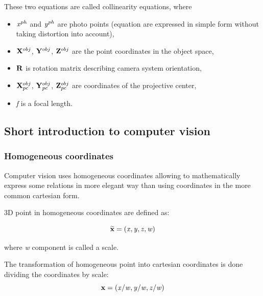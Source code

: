 \documentclass[a4paper,12pt]{article}
\newcommand{\ematr}[1]{
{\bf #1}
}
\newcommand{\evect}[1]{
{\bf #1}
}
\newcommand{\ehvect}[1]{
{\bf \widetilde{#1}}
}
\newcommand{\escal}[1]{
{\it #1}
}
\begin{document}
These two equations are called collinearity equations, where
\begin{itemize}
  \item $\escal{x}^{ph}$ and $\escal{y}^{ph}$ are photo points (equation are expressed in simple form without taking distortion into account),
  \item $\evect{X}^{obj}$, $\evect{Y}^{obj}$, $\evect{Z}^{obj}$ are the point coordinates in the object space,
  \item $\ematr{R}$ is rotation matrix describing camera system orientation,
  \item $\evect{X}^{obj}_{pc}$, $\evect{Y}^{obj}_{pc}$, $\evect{Z}^{obj}_{pc}$ are coordinates of the projective center,
  \item \escal{f} is a focal length.
\end{itemize}


\subsection{Short introduction to computer vision}


\subsubsection{Homogeneous coordinates}


Computer vision uses homogeneous coordinates allowing to mathematically express some relations
 in more elegant way than using coordinates in the more common cartesian form. 

3D point in homogeneous coordinates are defined as:

\begin{equation}
\ehvect{x} = (\escal{x}, \escal{y}, \escal{z}, \escal{w})
\end{equation}

where \escal{w} component is called a scale.

The transformation of homogeneous point into cartesian coordinates is done dividing 
the coordinates by scale:
\begin{equation}
\evect{x} = (\escal{x} / \escal{w}, \escal{y} / \escal{w}, \escal{z} / \escal{w})
\end{equation}
\end{document}
